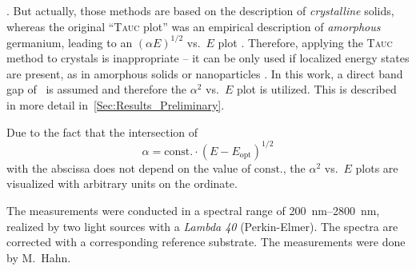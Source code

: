     \cite{cheng1996,al-kuhaili2007,singh2019,farrell2015}.
But actually, those methods are based on the description of \emph{crystalline} solids, whereas the original \enquote{\textsc{Tauc} plot} was an empirical description of \emph{amorphous} germanium, leading to an $(\alpha E)^{1/2}$ vs.\ $E$ plot
    \cite{tauc2005}.
Therefore, applying the \textsc{Tauc} method to crystals is inappropriate -- it can be only used if localized energy states are present, as in amorphous solids or nanoparticles
    \cite{dolgonos2016}.
In this work, a direct band gap of \cro\ is assumed and therefore the $\alpha^2$ vs.\ $E$ plot is utilized.
This is described in more detail in~\ref{Sec:Results_Preliminary}.

Due to the fact that the intersection of 
\begin{equation*}
    \alpha=\mathrm{const.}\cdot(E-E_\mathrm{opt})^{1/2}
\end{equation*}
with the abscissa does not depend on the value of $\mathrm{const.}$, the $\alpha^2$ vs.\ $E$ plots are visualized with arbitrary units on the ordinate.

The measurements were conducted in a spectral range of \qtyrange{200}{2800}{\nm}, realized by two light sources with a \textit{Lambda 40} (Perkin-Elmer).
The spectra are corrected with a corresponding reference substrate.
The measurements were done by M.\ Hahn.
